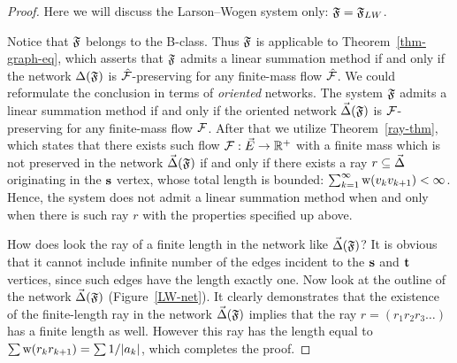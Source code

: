 \documentclass[12pt]{amsart}
\begin{document}
      \begin{proof}
        Here we will discuss the Larson--Wogen system only: $\mathfrak{F} = \mathfrak{F}_{LW}$.

        Notice that $\mathfrak{F}$ belongs to the B-class.
        Thus $\mathfrak{F}$ is applicable to Theorem~\ref{thm-graph-eq}, which asserts
          that $\mathfrak{F}$ admits a linear summation method if and only if
          the network $\Delta(\mathfrak{F})$ is $\mathcal{\hat{F}}$-preserving for any
          finite-mass flow $\mathcal{\hat{F}}$.
        We could reformulate the conclusion in terms of \emph{oriented} networks.
        The system $\mathfrak{F}$ admits a linear summation method if and only if
          the oriented network $\vec{\Delta}(\mathfrak{F})$ is $\mathcal{F}$-preserving for any
          finite-mass flow $\mathcal{F}$.
        After that we utilize Theorem~\ref{ray-thm}, which states that there exists such
          flow $\mathcal{F}: \vec{E} \to \mathbb{R}^{+}$ with a finite mass which is not preserved in
          the network $\vec{\Delta}(\mathfrak{F})$
          if and only if there exists a ray $r \subseteq \vec{\Delta} $ originating in the $\mathbf{s}$ vertex,
          whose total length is bounded: $ \sum_{k=1}^\infty \mathrm{w}(v_k v_{k+1}) < \infty$.
          Hence, the system does not admit a linear summation method when and only when there is such ray $r$
            with the properties specified up above.

          How does look the ray of a finite length in the network like $\vec{\Delta}(\mathfrak{F})$?
          It is obvious that it cannot include infinite number of the edges incident to the
            $\mathbf{s}$ and $\mathbf{t}$ vertices, since such edges have the length exactly one.
          Now look at the outline of the network $\vec{\Delta}(\mathfrak{F})$ (Figure~\ref{LW-net}).
          It clearly demonstrates that the existence of the finite-length ray in the network $\vec{\Delta}(\mathfrak{F})$ implies that
            the ray $r=(r_1 r_2 r_3\dots)$ has a finite length as well.
          However this ray has the length equal to $\sum \mathrm{w}(r_k r_{k+1}) = \sum 1/\lvert a_k \rvert$,
          which completes the proof.
      \end{proof}
      \pagebreak
\end{document}
